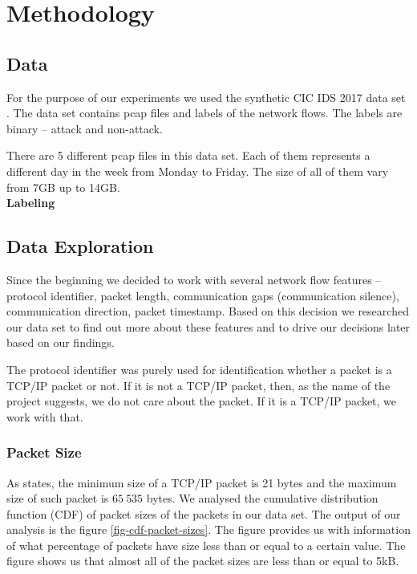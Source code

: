 \documentclass{article}
\begin{document}
\section{Methodology}
\subsection{Data}\label{sec-data-cic-ids-2017}
For the purpose of our experiments we used the synthetic CIC IDS 2017 data set \cite{sharafaldin2018toward}. The data set contains pcap files and labels of the network flows. The labels are binary -- attack and non-attack.

There are 5 different pcap files in this data set. Each of them represents a different day in the week from Monday to Friday. The size of all of them vary from 7GB up to 14GB.\\

\noindent\textbf{Labeling}\\


\subsection{Data Exploration}\label{sec-dataset-exploration}
Since the beginning we decided to work with several network flow features -- protocol identifier, packet length, communication gaps (communication silence), communication direction, packet timestamp. Based on this decision we researched our data set to find out more about these features and to drive our decisions later based on our findings.

The protocol identifier was purely used for identification whether a packet is a TCP/IP packet or not. If it is not a TCP/IP packet, then, as the name of the project suggests, we do not care about the packet. If it is a TCP/IP packet, we work with that.

\subsubsection{Packet Size}
As \cite{oreilly-tcp} states, the minimum size of a TCP/IP packet is 21 bytes and the maximum size of such packet is $65\ 535$ bytes. We analysed the cumulative distribution function (CDF) of packet sizes of the packets in our data set. The output of our analysis is the figure \ref{fig-cdf-packet-sizes}. The figure provides us with information of what percentage of packets have size less than or equal to a certain value. The figure shows us that almost all of the packet sizes are less than or equal to 5kB.
\end{document}
